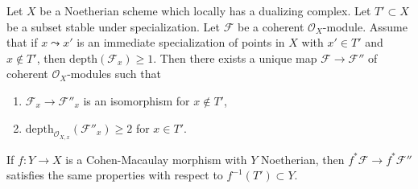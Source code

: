 \begin{lemma}
\label{lemma-make-S2-along-T-simple}
Let $X$ be a Noetherian scheme which locally has a dualizing complex.
Let $T' \subset X$ be a subset stable under specialization.
Let $\mathcal{F}$ be a coherent $\mathcal{O}_X$-module.
Assume that if $x \leadsto x'$ is an immediate specialization
of points in $X$ with $x' \in T'$ and $x \not \in T'$, then
$\text{depth}(\mathcal{F}_x) \geq 1$.
Then there exists a unique map $\mathcal{F} \to \mathcal{F}''$
of coherent $\mathcal{O}_X$-modules such that
\begin{enumerate}
\item $\mathcal{F}_x \to \mathcal{F}''_x$ is an isomorphism
for $x \not \in T'$,
\item $\text{depth}_{\mathcal{O}_{X, x}}(\mathcal{F}''_x) \geq 2$
for $x \in T'$.
\end{enumerate}
If $f : Y \to X$ is a Cohen-Macaulay morphism with $Y$ Noetherian,
then $f^*\mathcal{F} \to f^*\mathcal{F}''$ satisfies the same properties
with respect to $f^{-1}(T') \subset Y$.
\end{lemma}

